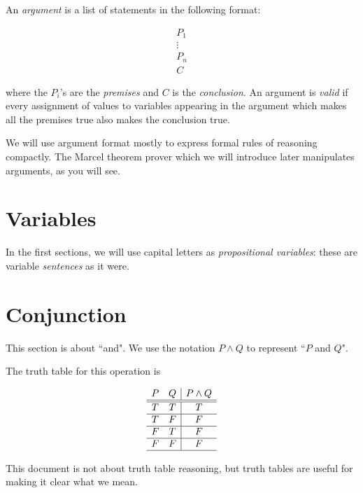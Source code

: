 \documentclass[12pt]{article}
\begin{document}
An {\em argument} is a list of statements in the following format:

$$\begin{array}  {c}

P_1 \\

\vdots \\

P_n \\ \hline

C \end{array}$$

where the $P_i$'s are the {\em premises\/} and $C$ is the {\em conclusion\/}.  An argument is {\em valid\/} if every assignment of values to variables appearing in the argument which makes all the premises true also makes the conclusion true.

We will use argument format mostly to express formal rules of reasoning compactly.  The Marcel theorem prover which we will introduce later manipulates arguments, as you will see.

\section{Variables}

In the first sections, we will use capital letters as {\em propositional variables\/}:  these are variable {\em sentences\/} as it were.

\newpage

\section{Conjunction}

This section is about ``and".  We use the notation $P \wedge Q$ to represent ``$P$ and $Q$".

The truth table for this operation is

$$\begin{array}{cc|c}

P & Q & P \wedge Q \\ \hline \hline

T & T & T \\ \hline
T & F & F \\ \hline
F & T & F \\ \hline
F & F & F \\ \hline

\end{array}$$

This document is not about truth table reasoning, but truth tables are useful for making it clear what we mean.
\end{document}
